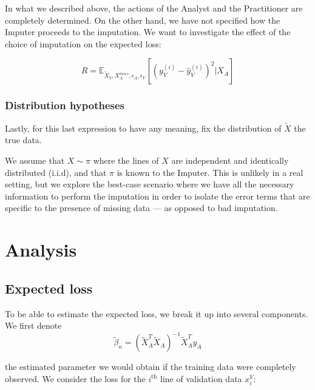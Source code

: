 In what we described above, the actions of the Analyst and the Practitioner are completely determined. On the other hand, we have not specified how the Imputer proceeds to the imputation. We want to investigate the effect of the choice of imputation on the expected loss:

$$R = \mathbb{E}_{\tilde{X}_V, X_A^{miss}, \epsilon_A, \epsilon_V}[(y_V^{(i)} - \hat{y}_V^{(i)})^2 \vert X_A]$$ %

			\subsubsection{Distribution hypotheses}
Lastly, for this last expression to have any meaning, fix the distribution of $\tilde{X}$ the true data.

We assume that $X \sim \pi$ where the lines of $X$ are independent and identically distributed (i.i.d), and that $\pi$ is known to the Imputer. This is unlikely in a real setting, but we explore the best-case scenario where we have all the necessary information to perform the imputation in order to isolate the error terms that are specific to the presence of missing data --- as opposed to bad imputation.

	\section{Analysis}
		\subsection{Expected loss}
To be able to estimate the expected loss, we break it up into several components. We first denote 
$$
\tilde{\beta}_n = (\tilde{X}_A^T \tilde{X}_A)^{-1} \tilde{X}_A^T y_A 
$$

the estimated parameter we would obtain if the training data were completely observed. We consider the loss for the $i^{\text{th}}$ line of validation data $x_i^V$:

